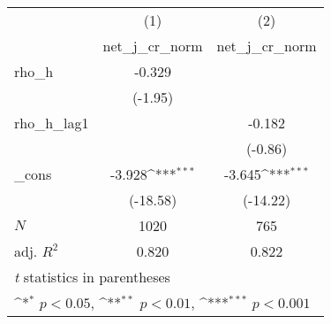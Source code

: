 {
\def\sym#1{\ifmmode^{#1}\else\(^{#1}\)\fi}
\begin{tabular}{l*{2}{c}}
\toprule
            &\multicolumn{1}{c}{(1)}&\multicolumn{1}{c}{(2)}\\
            &\multicolumn{1}{c}{net\_j\_cr\_norm}&\multicolumn{1}{c}{net\_j\_cr\_norm}\\
\midrule
rho\_h       &      -0.329         &                     \\
            &     (-1.95)         &                     \\
\addlinespace
rho\_h\_lag1  &                     &      -0.182         \\
            &                     &     (-0.86)         \\
\addlinespace
\_cons      &      -3.928\sym{***}&      -3.645\sym{***}\\
            &    (-18.58)         &    (-14.22)         \\
\midrule
\(N\)       &        1020         &         765         \\
adj. \(R^{2}\)&       0.820         &       0.822         \\
\bottomrule
\multicolumn{3}{l}{\footnotesize \textit{t} statistics in parentheses}\\
\multicolumn{3}{l}{\footnotesize \sym{*} \(p<0.05\), \sym{**} \(p<0.01\), \sym{***} \(p<0.001\)}\\
\end{tabular}
}
